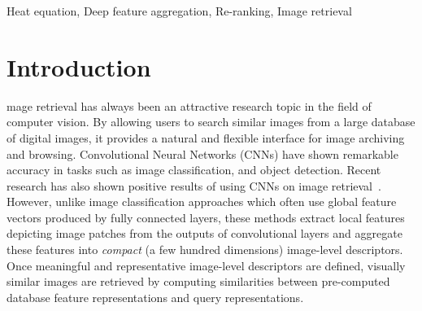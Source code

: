 \documentclass[journal]{IEEEtran}
\begin{document}
\begin{IEEEkeywords}
Heat equation, Deep feature aggregation, Re-ranking, Image retrieval
\end{IEEEkeywords}



%
\IEEEpeerreviewmaketitle


\section{Introduction}
%
%
%
%
mage retrieval has always been an attractive research topic in the field of computer vision.
By allowing users to search similar images from a large database of digital images,
it provides a natural and flexible interface for image archiving and browsing. Convolutional Neural  Networks (CNNs) have shown remarkable accuracy in tasks such as image classification, and object detection. Recent research has also shown positive results of using CNNs
on image retrieval~\cite{babenko2015aggregating,kalantidis2016cross,hoang2017selective, chadha2017voronoi, zhang2018query}. However, unlike image classification approaches which often use global feature vectors produced by fully connected layers, %
these methods extract local features depicting image patches from the outputs of convolutional layers and aggregate these features into \emph{compact} (a few hundred dimensions) image-level descriptors.
Once meaningful and representative image-level descriptors are defined, visually similar images are retrieved by computing similarities between pre-computed database feature representations and query representations.
\end{document}
